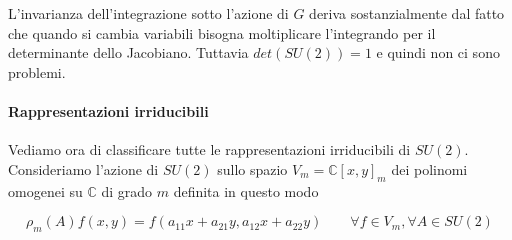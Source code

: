 \documentclass[11pt]{article}
\theoremstyle{plain}
\theoremstyle{definition}
\theoremstyle{remark}
\newcommand{\C}{\mathbb{C}}
\begin{document}
L'invarianza dell'integrazione sotto l'azione di $G$ deriva sostanzialmente dal fatto che quando si cambia variabili bisogna moltiplicare l'integrando per il determinante dello Jacobiano. Tuttavia $det(SU(2)) = 1$ e quindi non ci sono problemi.

\paragraph{Rappresentazioni irriducibili}
Vediamo ora di classificare tutte le rappresentazioni irriducibili di $SU(2)$. 
Consideriamo l'azione di $SU(2)$ sullo spazio $V_m = \C[x,y]_m$ dei polinomi omogenei su $\C$ di grado $m$ definita in questo modo 

 \[
 \rho_m(A) f(x, y) = f(a_{11} x + a_{21} y , a_{12} x + a_{22} y) \qquad \forall f \in V_m, \forall A \in SU(2)
 \]
\end{document}
